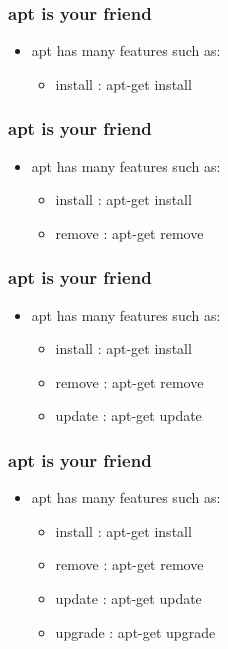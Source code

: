 \begin{frame}
    \frametitle{apt is your friend}
    \begin{itemize}
        \item apt has many features such as:
        \begin{itemize}
            \item install : apt-get install
        \end{itemize}
    \end{itemize}
\end{frame}
\begin{frame}
    \frametitle{apt is your friend}
    \begin{itemize}
        \item apt has many features such as:
        \begin{itemize}
            \item install : apt-get install
            \item remove : apt-get remove
        \end{itemize}
    \end{itemize}
\end{frame}
\begin{frame}
    \frametitle{apt is your friend}
    \begin{itemize}
        \item apt has many features such as:
        \begin{itemize}
            \item install : apt-get install
            \item remove : apt-get remove
            \item update : apt-get update
        \end{itemize}
    \end{itemize}
\end{frame}
\begin{frame}
    \frametitle{apt is your friend}
    \begin{itemize}
        \item apt has many features such as:
        \begin{itemize}
            \item install : apt-get install
            \item remove : apt-get remove
            \item update : apt-get update
            \item upgrade : apt-get upgrade
        \end{itemize}
    \end{itemize}
\end{frame}
